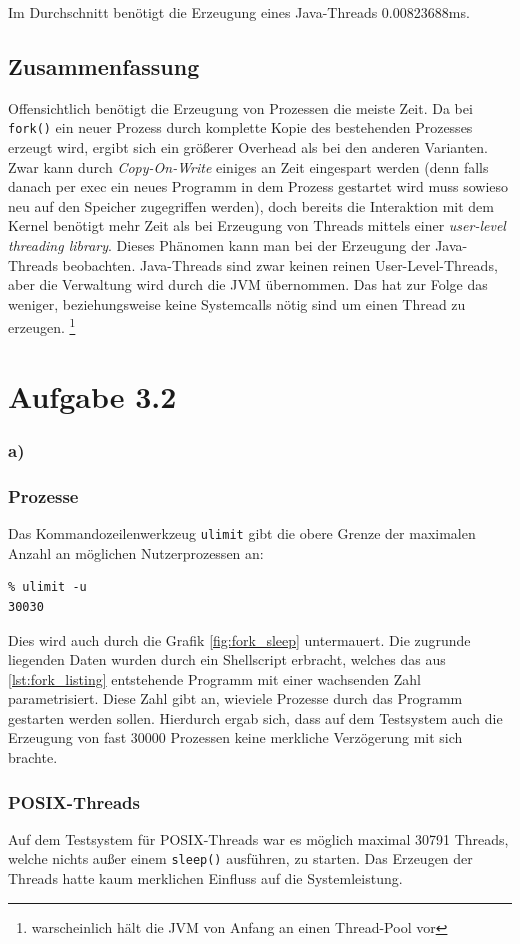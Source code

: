 \documentclass[a4paper,
12pt,
BCOR12mm,
]{scrartcl}
\begin{document}
Im Durchschnitt benötigt die Erzeugung eines Java-Threads 0.00823688ms.



\subsection*{Zusammenfassung}
Offensichtlich benötigt die Erzeugung von Prozessen die meiste Zeit. Da bei
\verb|fork()| ein neuer Prozess durch komplette Kopie des bestehenden Prozesses
erzeugt wird, ergibt sich ein größerer Overhead als bei den anderen Varianten. Zwar
kann durch \emph{Copy-On-Write} einiges an Zeit eingespart werden (denn falls danach per
exec ein neues Programm in dem Prozess gestartet wird muss sowieso neu auf den Speicher
zugegriffen werden), doch bereits die Interaktion mit dem Kernel benötigt mehr Zeit als
bei Erzeugung von Threads mittels einer \emph{user-level threading library}.
Dieses Phänomen kann man bei der Erzeugung der Java-Threads beobachten. Java-Threads sind
zwar keinen reinen User-Level-Threads, aber die Verwaltung wird durch die JVM übernommen.
Das hat zur Folge das weniger, beziehungsweise keine Systemcalls nötig sind um einen
Thread zu erzeugen. \footnote{warscheinlich hält die JVM von Anfang an einen Thread-Pool vor}

\section*{Aufgabe 3.2} 
\subsubsection*{a)}
\subsubsection*{Prozesse} 
Das Kommandozeilenwerkzeug \verb|ulimit| gibt die obere Grenze der maximalen Anzahl an
möglichen Nutzerprozessen an:
\begin{verbatim} 
% ulimit -u
30030
\end{verbatim}
Dies wird auch durch die Grafik \ref{fig:fork_sleep} untermauert. Die zugrunde liegenden
Daten wurden durch ein Shellscript erbracht, welches das aus \ref{lst:fork_listing}
entstehende Programm mit einer wachsenden Zahl parametrisiert. Diese Zahl gibt an,
wieviele Prozesse durch das Programm gestarten werden sollen. Hierdurch ergab sich, dass
auf dem Testsystem auch die Erzeugung von fast $30000$ Prozessen keine merkliche
Verzögerung mit sich brachte.
\subsubsection*{POSIX-Threads}
Auf dem Testsystem für POSIX-Threads war es möglich maximal 30791 Threads, welche nichts außer einem \verb|sleep()|
ausführen, zu starten. Das Erzeugen der Threads hatte kaum merklichen Einfluss auf die Systemleistung.
\end{document}
